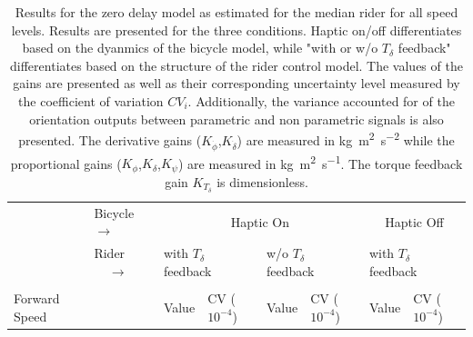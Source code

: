 \begin{table}[]
    \caption{ Results for the zero delay model as estimated for the median rider for all speed levels. Results are presented for the three conditions. Haptic on/off differentiates based on the dyanmics of the bicycle model, while "with or w/o \ensuremath{T_\delta} feedback" differentiates based on the structure of the rider control model. The values of the gains are presented as well as their corresponding uncertainty level measured by the coefficient of variation \ensuremath{CV_i}. Additionally, the variance accounted for of the orientation outputs between parametric and non parametric signals is also presented. The derivative gains (\ensuremath{K_{\dot{\phi}}},\ensuremath{K_{\dot{\delta}}}) are measured in \si{\kilogram\square\meter\per\square\second} while the proportional gains (\ensuremath{K_{\phi}},\ensuremath{K_{\delta}},\ensuremath{K_{\psi}}) are measured in \si{\kilogram\square\meter\per\second}. The torque feedback gain \ensuremath{K_{T_\delta}} is dimensionless.}
    \label{tb:no_delay}
    \begin{tabular}{llcccccc}
    \hline
                                                   & Bicycle $\rightarrow$                                              & \multicolumn{4}{c}{Haptic On}                                                                                                                                                                         & \multicolumn{2}{c}{Haptic Off}                                                                    \\ \cline{2-8} 
                                                   & {\color[HTML]{333333} Rider $\;\;\;\;\rightarrow$} & \multicolumn{2}{l}{with $T_\delta$ feedback}                                                      & \multicolumn{2}{l}{w/o  $T_\delta$ feedback}                                                      & \multicolumn{2}{l}{with $T_\delta$ feedback}                                                      \\ \cline{2-8} 
                                                   &                                                                    & \multicolumn{1}{l}{}                        & \multicolumn{1}{l}{}                                & \multicolumn{1}{l}{}                        & \multicolumn{1}{l}{}                                & \multicolumn{1}{l}{}                        & \multicolumn{1}{l}{}                                \\
    \multirow{-2}{*}{Forward Speed}                &                                                                    & \multicolumn{1}{l}{\multirow{-2}{*}{Value}} & \multicolumn{1}{l}{\multirow{-2}{*}{CV ($10^{-4}$)}} & \multicolumn{1}{l}{\multirow{-2}{*}{Value}} & \multicolumn{1}{l}{\multirow{-2}{*}{CV ($10^{-4}$)}} & \multicolumn{1}{l}{\multirow{-2}{*}{Value}} & \multicolumn{1}{l}{\multirow{-2}{*}{CV ($10^{-4}$)}} \\ \hline

\end{tabular}
\end{table}
